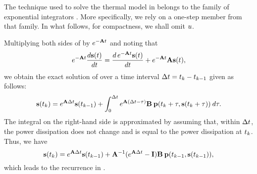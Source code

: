 The technique used to solve the thermal model in  belongs to the family of exponential integrators \cite{hochbruck2010}.
More specifically, we rely on a one-step member from that family.
In what follows, for compactness, we shall omit $u$.

Multiplying both sides of  by $e^{- \mathbf{A} t}$ and noting that
\[
  e^{-\mathbf{A} t} \frac{d\mathbf{s}(t)}{dt} = \frac{d\, e^{-\mathbf{A} t} \mathbf{s}(t)}{dt} + e^{-\mathbf{A} t} \mathbf{A} \mathbf{s}(t),
\]
we obtain the exact solution of  over a time interval $\Delta t = t_k - t_{k - 1}$ given as follows:
\[
  \mathbf{s}(t_k) = e^{\mathbf{A} \Delta t} \mathbf{s}(t_{k - 1}) + \int_0^{\Delta t} e^{\mathbf{A} (\Delta t - \tau)} \mathbf{B} \: \mathbf{p}(t_k + \tau, \mathbf{s}(t_k + \tau)) \: d\tau.
\]
The integral on the right-hand side is approximated by assuming that, within $\Delta t$, the power dissipation does not change and is equal to the power dissipation at $t_k$.
Thus, we have
\[
  \mathbf{s}(t_k) = e^{\mathbf{A} \Delta t} \mathbf{s}(t_{k - 1}) + \mathbf{A}^{-1}(e^{\mathbf{A} \Delta t} - \mathbf{I}) \mathbf{B} \: \mathbf{p}(t_{k - 1}, \mathbf{s}(t_{k - 1})),
\]
which leads to the recurrence in .
